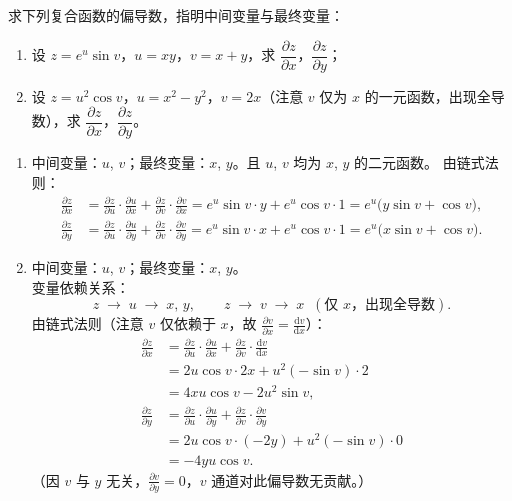 \documentclass[answer]{THUExam}
\begin{document}
\begin{problem}
求下列复合函数的偏导数，指明中间变量与最终变量：
\begin{enumerate}
\item 设 $z=e^{u}\sin v$，$u=xy$，$v=x+y$，求 $\dfrac{\partial z}{\partial x}$，$\dfrac{\partial z}{\partial y}$；
\item 设 $z=u^2\cos v$，$u=x^2-y^2$，$v=2x$（注意 $v$ 仅为 $x$ 的一元函数，出现全导数），求 $\dfrac{\partial z}{\partial x}$，$\dfrac{\partial z}{\partial y}$。
\end{enumerate}
\end{problem}

\begin{solution}
\begin{enumerate}
\item 中间变量：$u$, $v$；最终变量：$x$, $y$。且 $u$, $v$ 均为 $x$, $y$ 的二元函数。
由链式法则：
\begin{align*}
\frac{\partial z}{\partial x}
&= \frac{\partial z}{\partial u}\cdot\frac{\partial u}{\partial x}
   +\frac{\partial z}{\partial v}\cdot\frac{\partial v}{\partial x}
 = e^{u}\sin v\cdot y + e^{u}\cos v\cdot 1
 = e^{u}\big(y\sin v+\cos v\big), \\[4pt]
\frac{\partial z}{\partial y}
&= \frac{\partial z}{\partial u}\cdot\frac{\partial u}{\partial y}
   +\frac{\partial z}{\partial v}\cdot\frac{\partial v}{\partial y}
 = e^{u}\sin v\cdot x + e^{u}\cos v\cdot 1
 = e^{u}\big(x\sin v+\cos v\big).
\end{align*}

\item 中间变量：$u$, $v$；最终变量：$x$, $y$。\\
变量依赖关系：
\[
z\;\longrightarrow\; u\;\longrightarrow\; x,\,y,
\qquad
z\;\longrightarrow\; v\;\longrightarrow\; x \;\;(\text{仅 }x，\text{出现全导数}).
\]
由链式法则（注意 $v$ 仅依赖于 $x$，故 $\frac{\partial v}{\partial x}=\frac{\mathrm{d}v}{\mathrm{d}x}$）：
\begin{align*}
\frac{\partial z}{\partial x}
&= \frac{\partial z}{\partial u}\cdot\frac{\partial u}{\partial x}
   + \frac{\partial z}{\partial v}\cdot\frac{\mathrm{d}v}{\mathrm{d}x} \\[4pt]
&= 2u\cos v \cdot 2x + u^2(-\sin v) \cdot 2 \\[4pt]
&= 4xu\cos v - 2u^2\sin v, \\[6pt]
\frac{\partial z}{\partial y}
&= \frac{\partial z}{\partial u}\cdot\frac{\partial u}{\partial y}
   + \frac{\partial z}{\partial v}\cdot\frac{\partial v}{\partial y} \\[4pt]
&= 2u\cos v \cdot (-2y) + u^2(-\sin v) \cdot 0 \\[4pt]
&= -4yu\cos v.
\end{align*}
（因 $v$ 与 $y$ 无关，$\frac{\partial v}{\partial y}=0$，$v$ 通道对此偏导数无贡献。）
\end{enumerate}
\end{solution}
\bigskip
\end{document}

